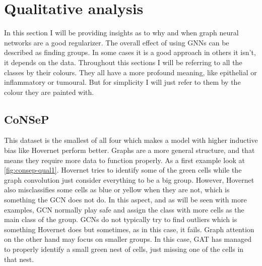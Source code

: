 \newpage
\section{Qualitative analysis}

In this section I will be providing insights as to why and when graph neural networks are a good regularizer. The overall effect of using GNNs can be described as finding groups. In some cases it is a good approach in others it isn't, it depends on the data. Throughout this sections I will be referring to all the classes by their colours. They all have a more profound meaning, like epithelial or inflammatory or tumoural. But for simplicity I will just refer to them by the colour they are painted with.

\subsection{CoNSeP}

This dataset is the smallest of all four which makes a model with higher inductive bias like Hovernet perform better. Graphs are a more general structure, and that means they require more data to function properly. As a first example look at \autoref{fig:consep-qual1}. Hovernet tries to identify some of the green cells while the graph convolution just consider everything to be a big group. However, Hovernet also misclassifies some cells as blue or yellow when they are not, which is something the GCN does not do. In this aspect, and as will be seen with more examples, GCN normally play safe and assign the class with more cells as the main class of the group. GCNs do not typically try to find outliers which is something Hovernet does but sometimes, as in this case, it fails. Graph attention on the other hand may focus on smaller groups. In this case, GAT has managed to properly identify a small green nest of cells, just missing one of the cells in that nest. 

